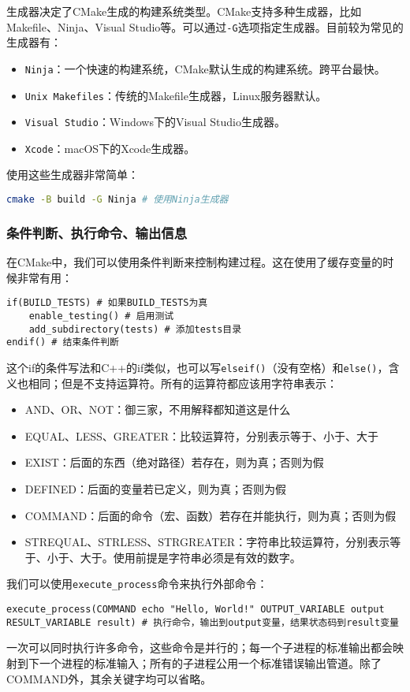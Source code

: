 \documentclass[../main.tex]{subfiles}
\begin{document}
生成器决定了CMake生成的构建系统类型。CMake支持多种生成器，比如Makefile、Ninja、Visual Studio等。可以通过\texttt{-G}选项指定生成器。目前较为常见的生成器有：

\begin{itemize}
  \item \texttt{Ninja}：一个快速的构建系统，CMake默认生成的构建系统。跨平台最快。
  \item \texttt{Unix Makefiles}：传统的Makefile生成器，Linux服务器默认。
  \item \texttt{Visual Studio}：Windows下的Visual Studio生成器。
  \item \texttt{Xcode}：macOS下的Xcode生成器。
\end{itemize}
使用这些生成器非常简单：
\begin{lstlisting}[language=bash]
cmake -B build -G Ninja # 使用Ninja生成器
\end{lstlisting}

\subsubsection{条件判断、执行命令、输出信息}

在CMake中，我们可以使用条件判断来控制构建过程。这在使用了缓存变量的时候非常有用：
\begin{lstlisting}
if(BUILD_TESTS) # 如果BUILD_TESTS为真
    enable_testing() # 启用测试
    add_subdirectory(tests) # 添加tests目录
endif() # 结束条件判断
\end{lstlisting}

这个if的条件写法和C++的if类似，也可以写\texttt{elseif()}（没有空格）和\texttt{else()}，含义也相同；但是不支持运算符。所有的运算符都应该用字符串表示：
\begin{itemize}
  \item AND、OR、NOT：御三家，不用解释都知道这是什么
  \item EQUAL、LESS、GREATER：比较运算符，分别表示等于、小于、大于
  \item EXIST：后面的东西（绝对路径）若存在，则为真；否则为假
  \item DEFINED：后面的变量若已定义，则为真；否则为假
  \item COMMAND：后面的命令（宏、函数）若存在并能执行，则为真；否则为假
  \item STREQUAL、STRLESS、STRGREATER：字符串比较运算符，分别表示等于、小于、大于。使用前提是字符串必须是有效的数字。
\end{itemize}

我们可以使用\texttt{execute\_process}命令来执行外部命令：
\begin{lstlisting}
execute_process(COMMAND echo "Hello, World!" OUTPUT_VARIABLE output RESULT_VARIABLE result) # 执行命令，输出到output变量，结果状态码到result变量
\end{lstlisting}
一次可以同时执行许多命令，这些命令是并行的；每一个子进程的标准输出都会映射到下一个进程的标准输入；所有的子进程公用一个标准错误输出管道。除了COMMAND外，其余关键字均可以省略。
\end{document}
